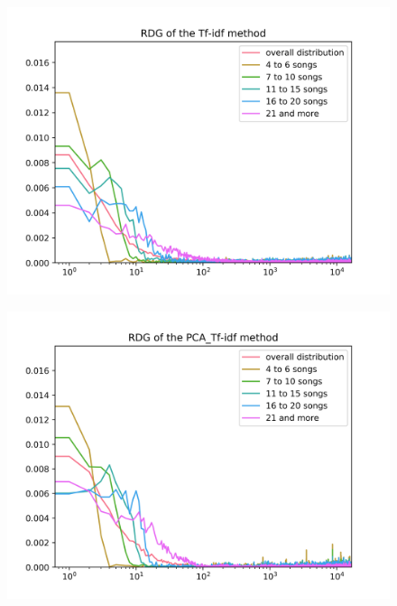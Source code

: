 \begin{figure}[h]
\centering
\begin{minipage}{.5\textwidth}
  \centering
  \includegraphics[width=1\linewidth]{./img/tf_idf_graph.png}
  \label{fig:tf_idf_distribution}
\end{minipage}%
\begin{minipage}{.5\textwidth}
  \centering
  \includegraphics[width=1\linewidth]{./img/pca_tf_idf_graph.png}
  \label{fig:pca_tf_idf_distribution}
\end{minipage}
\end{figure}

